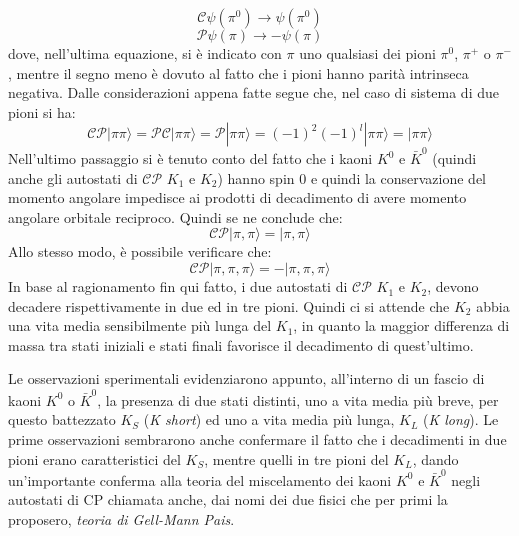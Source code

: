 \begin{equation}
 \mathscr{C}\psi(\pi^0) \rightarrow \psi(\pi^0)
\end{equation}
\begin{equation}
 \mathscr{P}\psi(\pi) \rightarrow -\psi(\pi)
\end{equation}
dove, nell'ultima equazione, si è indicato con $\pi$ uno qualsiasi dei pioni $\pi^0$, $\pi^+$ o $\pi^-$, mentre il segno meno è dovuto al fatto che i pioni hanno parità 
intrinseca negativa. Dalle considerazioni appena fatte segue che, nel caso di sistema di due pioni si ha:
\begin {equation}
\mathscr{C}\mathscr{P}|\pi\pi\rangle = \mathscr{P}\mathscr{C}|\pi\pi\rangle = \mathscr{P}|\pi\pi\rangle = (-1)^2 (-1)^l |\pi\pi\rangle = |\pi\pi\rangle
\end{equation}
Nell'ultimo passaggio si è tenuto conto del fatto che i kaoni $K^0$ e $\bar{K}^0$ (quindi anche gli autostati di $\mathscr{C}\mathscr{P}$ $K_1$ e $K_2$) hanno spin 0 e quindi 
la conservazione del momento angolare impedisce ai prodotti di decadimento di avere momento angolare orbitale reciproco.
Quindi se ne conclude che:
\begin{equation}
 \mathscr{C}\mathscr{P}|\pi,\pi\rangle = |\pi,\pi\rangle
\end{equation}
Allo stesso modo, è possibile verificare che:
\begin{equation}
 \mathscr{C}\mathscr{P}|\pi,\pi,\pi\rangle = -|\pi,\pi,\pi\rangle
\end{equation}
In base al ragionamento fin qui fatto, i due autostati di $\mathscr{C}\mathscr{P}$ $K_1$ e $K_2$, devono decadere rispettivamente in due ed in tre pioni.
Quindi ci si attende che $K_2$ abbia una vita media sensibilmente più lunga del $K_1$, in quanto la maggior differenza di massa tra stati iniziali e stati 
finali favorisce il decadimento di quest'ultimo.

Le osservazioni sperimentali evidenziarono appunto, all'interno di un fascio di kaoni $K^0$ o $\bar{K}^0$, la presenza di due stati distinti, uno a vita media più breve,
per questo battezzato $K_S$ (\emph{K short}) ed uno a vita media più lunga, $K_L$ (\emph{K long}).
Le prime osservazioni sembrarono anche confermare il fatto che i decadimenti in due pioni erano caratteristici del $K_S$, mentre quelli in tre pioni del $K_L$, dando
un'importante conferma alla teoria del miscelamento dei kaoni $K^0$ e $\bar{K}^0$ negli autostati di CP chiamata anche, dai nomi dei due fisici che per primi la proposero,
\emph{teoria di Gell-Mann Pais}\cite{Kabir}. 

